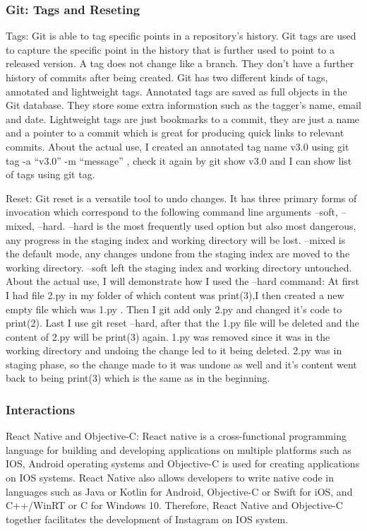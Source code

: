 \documentclass[a4paper, 11pt]{report}
\begin{document}
\subsubsection{ Git: Tags and Reseting}

Tags: Git is able to tag specific points in a repository’s history. Git tags are used to capture the specific point in the history that is further used to point to a released version. A tag does not change like a branch. They don’t have a further history of commits after being created. Git has two different kinds of tags, annotated and lightweight tags. Annotated tags are saved as full objects in the Git database. They store some extra information such as the tagger’s name, email and date. Lightweight tags are just bookmarks to a commit, they are just a name and a pointer to a commit which is great for producing quick links to relevant commits.  
About the actual use, I created an annotated tag name v3.0 using git tag -a “v3.0” -m “message” , check it again by git show v3.0  and I can show list of tags using git tag. 

Reset: Git reset is a versatile tool to undo changes. It has three primary forms of invocation which correspond to the following command line arguments --soft, --mixed, --hard. --hard is the most frequently used option but also most dangerous, any progress in the staging index and working directory will be lost. --mixed is the default mode, any changes undone from the staging index  are moved to  the working directory. --soft left the staging index and working directory untouched.
About the actual use, I will demonstrate how I used the –hard command: At first I had file 2.py in my folder of which content was print(3),I then created a new empty file which was 1.py . Then I git add only 2.py and changed it's code to print(2). Last I use git reset –hard, after that the 1.py file will be deleted and the content of 2.py will be print(3) again.
1.py was removed since it was in the working directory and undoing the change led to it being deleted. 2.py was in staging phase, so the change made to it was undone as well and it’s content went back to being print(3) which is the same as in the beginning.

\subsubsection{ Interactions}
React Native and Objective-C: React native is a cross-functional programming language for building and developing applications on multiple platforms such as IOS, Android operating 
systems and Objective-C is used for creating applications on IOS systems. React Native also allows developers to write native code in languages such as Java or Kotlin for Android, Objective-C or Swift for iOS, and C++/WinRT or C for Windows 10. Therefore, React Native and Objective-C together facilitates the development of Instagram on IOS system.
\end{document}
